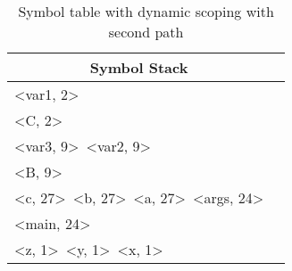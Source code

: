 \documentclass{article}
\begin{document}
\begin{table}[hp]
\begin{center}
\begin{tabular}{l l}
\toprule
\multicolumn{1}{c}{Symbol Stack}\\
\midrule
\textless var1, 2\textgreater \\
\textless C, 2\textgreater \\
\textless var3, 9\textgreater\ \textless var2, 9\textgreater \\
\textless B, 9\textgreater \\
\textless c, 27\textgreater\ \textless b, 27\textgreater\ \textless a, 27\textgreater\ \textless args, 24\textgreater \\
\textless main, 24\textgreater \\
\textless z, 1\textgreater\ \textless y, 1\textgreater\ \textless x, 1\textgreater \\
\bottomrule
\end{tabular}
\caption{Symbol table with dynamic scoping with second path}
\end{center}
\end{table}
\end{document}

